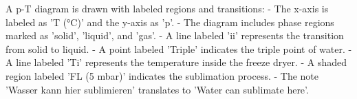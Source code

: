 A p-T diagram is drawn with labeled regions and transitions:  
- The x-axis is labeled as 'T (°C)' and the y-axis as 'p'.  
- The diagram includes phase regions marked as 'solid', 'liquid', and 'gas'.  
- A line labeled 'ii' represents the transition from solid to liquid.  
- A point labeled 'Triple' indicates the triple point of water.  
- A line labeled 'Ti' represents the temperature inside the freeze dryer.  
- A shaded region labeled 'FL (5 mbar)' indicates the sublimation process.  
- The note 'Wasser kann hier sublimieren' translates to 'Water can sublimate here'.